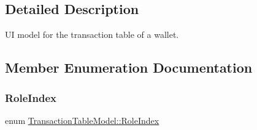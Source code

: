 \subsection{Detailed Description}
UI model for the transaction table of a wallet. 

\subsection{Member Enumeration Documentation}
\mbox{\label{class_transaction_table_model_a4b248508c36df598476affbf9871d1e6}} 
\subsubsection{\texorpdfstring{Role\+Index}{RoleIndex}}
{\footnotesize\ttfamily enum \mbox{\hyperlink{class_transaction_table_model_a4b248508c36df598476affbf9871d1e6}{Transaction\+Table\+Model\+::\+Role\+Index}}}


